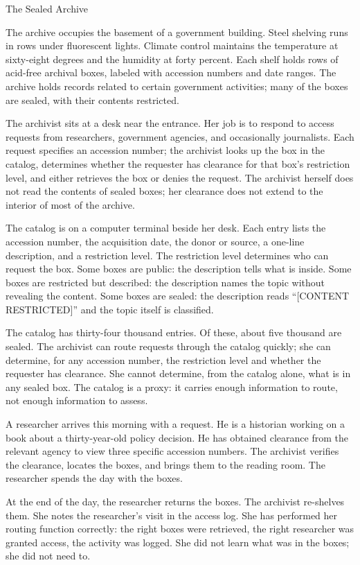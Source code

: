 \begin{coda}{The Sealed Archive}

The archive occupies the basement of a government building. Steel
shelving runs in rows under fluorescent lights. Climate control
maintains the temperature at sixty-eight degrees and the humidity at
forty percent. Each shelf holds rows of acid-free archival boxes,
labeled with accession numbers and date ranges. The archive holds
records related to certain government activities; many of the
boxes are sealed, with their contents restricted.

The archivist sits at a desk near the entrance. Her job is to
respond to access requests from researchers, government agencies,
and occasionally journalists. Each request specifies an accession
number; the archivist looks up the box in the catalog, determines
whether the requester has clearance for that box's restriction
level, and either retrieves the box or denies the request. The
archivist herself does not read the contents of sealed boxes; her
clearance does not extend to the interior of most of the archive.

The catalog is on a computer terminal beside her desk. Each entry
lists the accession number, the acquisition date, the donor or
source, a one-line description, and a restriction level. The
restriction level determines who can request the box. Some boxes
are public: the description tells what is inside. Some boxes are
restricted but described: the description names the topic without
revealing the content. Some boxes are sealed: the description
reads ``[CONTENT RESTRICTED]'' and the topic itself is classified.

The catalog has thirty-four thousand entries. Of these, about
five thousand are sealed. The archivist can route requests through
the catalog quickly; she can determine, for any accession number,
the restriction level and whether the requester has clearance. She
cannot determine, from the catalog alone, what is in any sealed
box. The catalog is a proxy: it carries enough information to
route, not enough information to assess.

A researcher arrives this morning with a request. He is a
historian working on a book about a thirty-year-old policy
decision. He has obtained clearance from the relevant agency to
view three specific accession numbers. The archivist verifies the
clearance, locates the boxes, and brings them to the reading room.
The researcher spends the day with the boxes.

At the end of the day, the researcher returns the boxes. The
archivist re-shelves them. She notes the researcher's visit in
the access log. She has performed her routing function correctly:
the right boxes were retrieved, the right researcher was granted
access, the activity was logged. She did not learn what was in
the boxes; she did not need to.


\end{coda}
